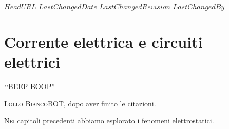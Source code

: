 \svnidlong
{$HeadURL$}
{$LastChangedDate$}
{$LastChangedRevision$}
{$LastChangedBy$}

\chapter{Corrente elettrica e circuiti elettrici}

\begin{introduction}
	‘‘BEEP BOOP''
	\begin{flushright}
		\textsc{Lollo BiancoBOT}, dopo aver finito le citazioni. %
	\end{flushright}
\end{introduction} %
\lettrine[findent=1pt, nindent=0pt]{N}{ei} capitoli precedenti abbiamo esplorato i fenomeni elettrostatici. 
